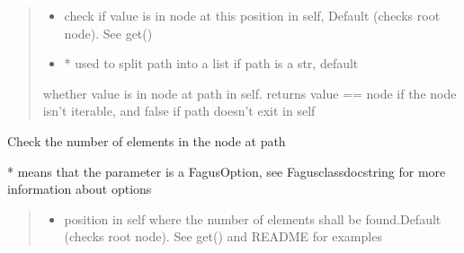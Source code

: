 \documentclass[a4paper,10pt,english]{sphinxmanual}
\begin{document}
\begin{fulllineitems}
\begin{fulllineitems}
\begin{quote}
\begin{description}
\begin{itemize}
\item {}
\sphinxAtStartPar
{} \textendash{} check if value is in node at this position in self, Default  (checks root node). See get()

\item {}
\sphinxAtStartPar
{} \textendash{} * used to split path into a list if path is a str, default 

\end{itemize}

\sphinxAtStartPar
whether value is in node at path in self. returns value == node if the node isn’t iterable, and false if
path doesn’t exit in self

\end{description}\end{quote}

\end{fulllineitems}


\begin{fulllineitems}
\label{\detokenize{fagus.fagus:fagus.fagus.Fagus.count}}
\pysigstartsignatures
{}
\pysigstopsignatures
\sphinxAtStartPar
Check the number of elements in the node at path

\sphinxAtStartPar
* means that the parameter is a FagusOption, see Fagus\sphinxhyphen{}class\sphinxhyphen{}docstring for more information about options
\begin{quote}\begin{description}
\begin{itemize}
\item {}
\sphinxAtStartPar
{} \textendash{} position in self where the number of elements shall be found.Default  (checks root node). See
get() and README for examples


\end{itemize}
\end{description}
\end{quote}
\end{fulllineitems}
\end{fulllineitems}
\end{document}
